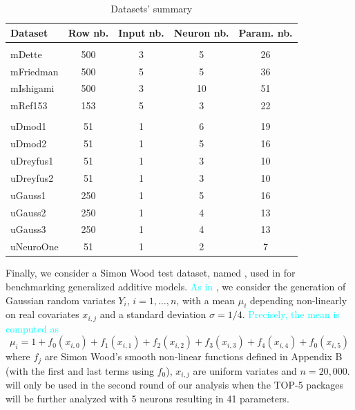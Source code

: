 \begin{Schunk}
\begin{table}

\caption{\label{tab:NNdatasets}Datasets' summary}
\centering
\fontsize{7}{9}\selectfont
\begin{tabular}[t]{lcccc}
\toprule
Dataset & Row nb. & Input nb. & Neuron nb. & Param. nb.\\
\midrule
\addlinespace[0.3em]
\multicolumn{5}{l}{\textbf{Multivariate}}\\
\hspace{1em}mDette & 500 & 3 & 5 & 26\\
\hspace{1em}mFriedman & 500 & 5 & 5 & 36\\
\hspace{1em}mIshigami & 500 & 3 & 10 & 51\\
\hspace{1em}mRef153 & 153 & 5 & 3 & 22\\
\addlinespace[0.3em]
\multicolumn{5}{l}{\textbf{Univariate}}\\
\hspace{1em}uDmod1 & 51 & 1 & 6 & 19\\
\hspace{1em}uDmod2 & 51 & 1 & 5 & 16\\
\hspace{1em}uDreyfus1 & 51 & 1 & 3 & 10\\
\hspace{1em}uDreyfus2 & 51 & 1 & 3 & 10\\
\hspace{1em}uGauss1 & 250 & 1 & 5 & 16\\
\hspace{1em}uGauss2 & 250 & 1 & 4 & 13\\
\hspace{1em}uGauss3 & 250 & 1 & 4 & 13\\
\hspace{1em}uNeuroOne & 51 & 1 & 2 & 7\\
\bottomrule
\end{tabular}
\end{table}

\end{Schunk}

Finally, we consider a Simon Wood test dataset, named ,
used in \citep{wood2011fast} for benchmarking generalized additive
models. \textcolor{cyan}{As in \citep{wood2011fast}}, we consider the
generation of Gaussian random variates \(Y_i\), \(i=1,\dots,n\), with a
mean \(\mu_i\) depending non-linearly on real covariates \(x_{i,j}\) and
a standard deviation \(\sigma=1/4\).
\textcolor{cyan}{Precisely, the mean is computed as} \[
\mu_i = 1+ f_0(x_{i,0})+f_1(x_{i,1})+f_2(x_{i,2})+f_3(x_{i,3})
+f_4(x_{i,4})+f_0(x_{i,5})
\] where \(f_j\) are Simon Wood's smooth non-linear functions defined in
Appendix B (with the first and last terms using \(f_0\)), \(x_{i,j}\)
are uniform variates and \(n=20,000\).  will only be used
in the second round of our analysis when the TOP-5 packages will be
further analyzed with 5 neurons resulting in 41 parameters.

